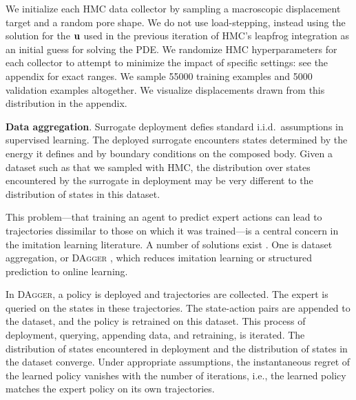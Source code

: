 We initialize each HMC data collector by sampling a macroscopic displacement target and a random pore shape. We do not use load-stepping, instead using the solution for the ${\mathbf{u}}$ used in the previous iteration of HMC's leapfrog integration as an initial guess for solving the PDE. We randomize HMC hyperparameters for each collector to attempt to minimize the impact of specific settings: see the appendix for exact ranges. We sample 55000 training examples and 5000 validation examples altogether. We visualize displacements drawn from this distribution in the appendix.%

\textbf{Data aggregation}.
Surrogate deployment defies standard i.i.d.\ assumptions in supervised learning.
The deployed surrogate encounters states determined by the energy it defines and by boundary conditions on the composed body. Given a dataset such as that we sampled with HMC, the distribution over states encountered by the surrogate in deployment may be very different to the distribution of states in this dataset.

This problem---that training an agent to predict expert actions can lead to trajectories dissimilar to those on which it was trained---is a central concern in the imitation learning literature. A number of solutions exist \citep{schroecker2017state}.
One is dataset aggregation, or \textsc{DAgger} \citep{ross2011reduction}, which reduces imitation learning or structured prediction to online learning.

In \textsc{DAgger}, a policy is deployed and trajectories are collected.
The expert is queried on the states in these trajectories.
The state-action pairs are appended to the dataset, and the policy is retrained on this dataset.
This process of deployment, querying, appending data, and retraining, is iterated.
The distribution of states encountered in deployment and the distribution of states in the dataset converge. 
Under appropriate assumptions, the instantaneous regret of the learned policy vanishes with the number of iterations, i.e., the learned policy matches the expert policy on its own trajectories.

